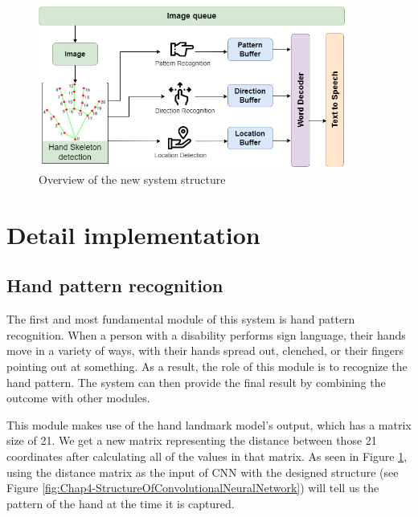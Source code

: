 \begin{figure}[H]
	\centering
	\includegraphics[width=0.9\textwidth]{img/Chap4/OverviewOfTheSystemModules-New.png}
	\caption{Overview of the new system structure}
	\label{fig:Chap4-OverviewOfTheSystemModules-New}
\end{figure}

\section{Detail implementation}\label{sec:DetailImplementation}

\subsection{Hand pattern recognition}

The first and most fundamental module of this system is hand pattern recognition. When a person with a disability performs sign language, their hands move in a variety of ways, with their hands spread out, clenched, or their fingers pointing out at something. As a result, the role of this module is to recognize the hand pattern. The system can then provide the final result by combining the outcome with other modules.

This module makes use of the hand landmark model's output, which has a matrix size of 21. We get a new matrix representing the distance between those 21 coordinates after calculating all of the values in that matrix. As seen in Figure \ref{fig:Chap4-OverviewOfTheSystemModules-New}, using the distance matrix as the input of CNN with the designed structure (see Figure \ref{fig:Chap4-StructureOfConvolutionalNeuralNetwork}) will tell us the pattern of the hand at the time it is captured.


